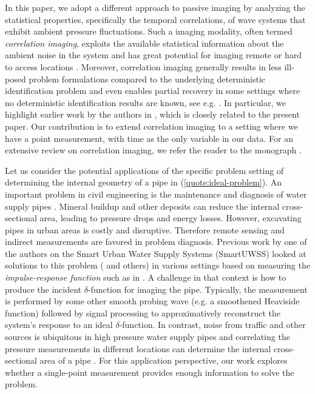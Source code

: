 \documentclass[10pt,a4paper]{article}
\theoremstyle{plain}
\theoremstyle{definition}
\theoremstyle{remark}
\numberwithin{equation}{section}
\begin{document}
In this paper, we adopt a different approach to passive imaging by analyzing the statistical properties, specifically the temporal correlations, of wave systems that exhibit ambient pressure fluctuations. Such a imaging modality, often termed \emph{correlation imaging}, exploits the available statistical information about the ambient noise in the system and has great potential for imaging remote or hard to access locations \cite{buckingham92_imagin_ocean_with_ambien_noise,gozum22_noise_based_high_resol_time}. Moreover, correlation imaging generally results in less ill-posed problem formulations compared to the underlying deterministic identification problem and even enables partial recovery in some settings where no deterministic identification results are known, see e.g. \cite{devaney1979inverse, garnier2009passive, garnier2012correlation,  bao2017inverse, helin2018atmospheric, caro2019inverse, agaltsov2020global, li2020inverse, li2022inverse1,li2022inverse2, triki2024fourier,  li2024stability}. In particular, we highlight earlier work by the authors in \cite{helin18_correl_based_passiv_imagin_b}, which is closely related to the present paper. Our contribution is to extend correlation imaging to a setting where we have a point measurement, with time as the only variable in our data.
For an extensive review on correlation imaging, we refer the reader to the monograph \cite{GP_passive}.

Let us consider the potential applications of the specific problem setting of determining the internal geometry of a pipe in (\ref{quote:ideal-problem}). An important problem in civil engineering is the maintenance and diagnosis of water supply pipes \cite{gozum22_noise_based_high_resol_time}.  Mineral buildup and other deposits can reduce the internal cross-sectional area, leading to pressure drops and energy losses. However, excavating pipes in urban areas is costly and disruptive. Therefore remote sensing and indirect measurements are favored in problem diagnosis. Previous work by one of the authors on the Smart Urban Water Supply Systems (SmartUWSS) looked at solutions to this problem (\cite{zouari19_inter_pipe_area_recon_as} and others) in various settings based on measuring the \emph{impulse-response function} such as in \cite{sondhi_gopinath}. A challenge in that context is how to produce the incident $\delta$-function for imaging the pipe. Typically, the measurement is performed by some other smooth probing wave (e.g. a smoothened Heaviside function) followed by signal processing to approximatively reconstruct {the} system's response to an ideal $\delta$-function. In contrast, noise from traffic and other sources is ubiquitous in high pressure water supply pipes and correlating the pressure measurements in different locations can determine the internal cross-sectional area of a pipe \cite{gozum22_noise_based_high_resol_time}. For this application perspective, our work explores whether a single-point measurement provides enough information to solve the problem.
\end{document}
